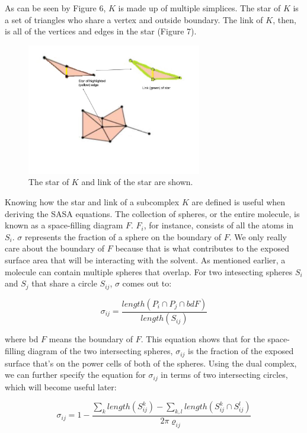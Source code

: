 \documentclass{article}
\begin{document}
As can be seen by Figure 6, $K$ is made up of multiple simplices. The star of $K$ is a set of triangles who share a vertex and outside boundary. The link of $K$, then, is all of the vertices and edges in the star (Figure 7).

\begin{figure}[h!]
\caption{The star of $K$ and link of the star are shown.\cite{Bryant}}
\centerline{\includegraphics[width=3in]{Figure5}}
\end{figure}

Knowing how the star and link of a subcomplex $K$ are defined is useful when deriving the SASA equations.
The collection of spheres, or the entire molecule, is known as a space-filling diagram $F$. $F_i$, for instance, consists of all the atoms in $S_i$. $\sigma$ represents the fraction of a sphere on the boundary of $F$. We only really care about the boundary of $F$ because that is what contributes to the exposed surface area that will be interacting with the solvent. As mentioned earlier, a molecule can contain multiple spheres that overlap. For two intesecting spheres $S_i$ and $S_j$ that share a circle $S_{ij}$, $\sigma$ comes out to:

\begin{equation}
\sigma_{ij} = \frac{length(P_i \cap P_j \cap bd F)}{length(S_{ij})}
\end{equation}

where bd $F$ means the boundary of $F$. This equation shows that for the space-filling diagram of the two intersecting spheres, $\sigma_{ij}$ is the fraction of the exposed surface that's on the power cells of both of the spheres.
Using the dual complex, we can further specify the equation for $\sigma_{ij}$ in terms of two intersecting circles, which will become useful later:

\begin{equation}
\sigma_{ij} = 1 - \frac{\sum_{k}length(S^k_{ij})- \sum_{k,l}length(S^k_{ij} \cap S^l_{ij})}{2\pi\varrho_{ij}}
\end{equation}
\end{document}
